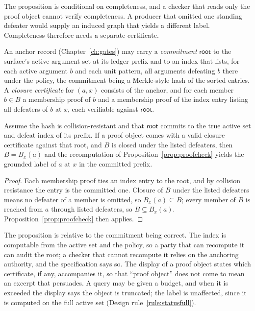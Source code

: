 The proposition is conditional on completeness, and a checker that reads only the proof object cannot verify completeness. A producer that omitted one standing defeater would supply an induced graph that yields a different label. Completeness therefore needs a separate certificate.

\begin{definition}\label{def:closurecert}
An anchor record (Chapter~\ref{ch:gates}) may carry a \emph{commitment} $\mathsf{root}$ to the surface's active argument set at its ledger prefix and to an index that lists, for each active argument $b$ and each unit pattern, all arguments defeating $b$ there under the policy, the commitment being a Merkle-style hash of the sorted entries. A \emph{closure certificate} for $(a,x)$ consists of the anchor, and for each member $b\in B$ a membership proof of $b$ and a membership proof of the index entry listing all defeaters of $b$ at $x$, each verifiable against $\mathsf{root}$.
\end{definition}

\begin{proposition}\label{prop:certified}
Assume the hash is collision-resistant and that $\mathsf{root}$ commits to the true active set and defeat index of its prefix. If a proof object comes with a valid closure certificate against that root, and $B$ is closed under the listed defeaters, then $B=B_x(a)$ and the recomputation of Proposition~\ref{prop:proofcheck} yields the grounded label of $a$ at $x$ in the committed prefix.
\end{proposition}

\begin{proof}
Each membership proof ties an index entry to the root, and by collision resistance the entry is the committed one. Closure of $B$ under the listed defeaters means no defeater of a member is omitted, so $B_x(a)\subseteq B$; every member of $B$ is reached from $a$ through listed defeaters, so $B\subseteq B_x(a)$. Proposition~\ref{prop:proofcheck} then applies.
\end{proof}

The proposition is relative to the commitment being correct. The index is computable from the active set and the policy, so a party that can recompute it can audit the root; a checker that cannot recompute it relies on the anchoring authority, and the specification says so. The display of a proof object states which certificate, if any, accompanies it, so that ``proof object'' does not come to mean an excerpt that persuades. A query may be given a budget, and when it is exceeded the display says the object is truncated; the label is unaffected, since it is computed on the full active set (Design rule~\ref{rule:statusfull}).

